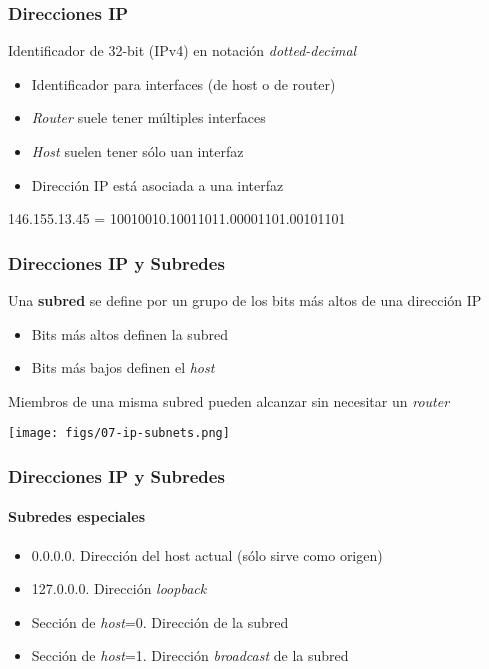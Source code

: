 \documentclass[letter]{beamer}
\begin{document}
\begin{frame}
  \frametitle{Direcciones IP}

  Identificador de 32-bit (IPv4) en notación {\em dotted-decimal}
  
  \begin{itemize}
    \item Identificador para interfaces (de host o de router)
    \item {\em Router} suele tener múltiples interfaces
    \item {\em Host} suelen tener sólo uan interfaz
    \item Dirección IP está asociada a una interfaz
  \end{itemize}

  \begin{center}
    146.155.13.45 = 10010010.10011011.00001101.00101101
  \end{center}  
  
\end{frame}
\begin{frame}
  \frametitle{Direcciones IP y Subredes}

  Una {\bf subred} se define por un grupo de los bits más altos de una dirección IP
  \begin{itemize}
    \item Bits más altos definen la subred
    \item Bits más bajos definen el {\em host}
  \end{itemize}
  
  Miembros de una misma subred pueden alcanzar sin necesitar un {\em router}
  
  \begin{center}
    \texttt{[image: figs/07-ip-subnets.png]}
  \end{center}
  
\end{frame}
\begin{frame}
  \frametitle{Direcciones IP y Subredes}
  \framesubtitle{Subredes especiales}
  
  \begin{itemize}
    \item 0.0.0.0. Dirección del host actual (sólo sirve como origen)
    \item 127.0.0.0. Dirección {\em loopback}
    \item Sección de {\em host}=0. Dirección de la subred
    \item Sección de {\em host}=1. Dirección {\em broadcast} de la subred
  \end{itemize}

\end{frame}
\end{document}
